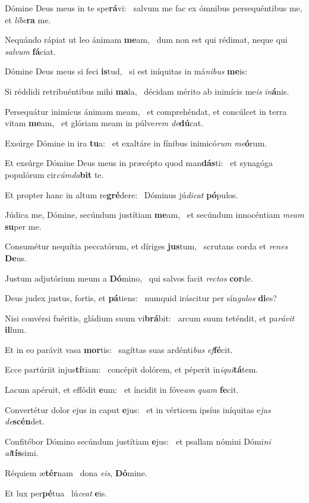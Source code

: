 \item Dómine Deus meus in te spe\textbf{rá}vi:~\psstar{} salvum me fac ex ómnibus persequéntibus me, et \textit{líbe}\textbf{ra} me.
\item Nequándo rápiat ut leo ánimam \textbf{me}am,~\psstar{} dum non est qui rédimat, neque qui \textit{salvum} \textbf{fá}ciat.
\item Dómine Deus meus si feci \textbf{is}tud,~\psstar{} si est iníquitas in má\textit{nibus} \textbf{me}is:
\item Si réddidi retribuéntibus mihi \textbf{ma}la,~\psstar{} décidam mérito ab inimícis me\textit{is} \textit{in}\textbf{á}nis.
\item Persequátur inimícus ánimam meam,~\pscross{} et comprehéndat, et concúlcet in terra vitam \textbf{me}am,~\psstar{} et glóriam meam in púlve\textit{rem} \textit{de}\textbf{dú}cat.
\item Exsúrge Dómine in ira \textbf{tu}a:~\psstar{} et exaltáre in fínibus inimicó\textit{rum} \textit{me}\textbf{ó}rum.
\item Et exsúrge Dómine Deus meus in præcépto quod man\textbf{dás}ti:~\psstar{} et synagóga populórum cir\textit{cúmda}\textbf{bit} te.
\item Et propter hanc in altum re\textbf{gré}dere:~\psstar{} Dóminus jú\textit{dicat} \textbf{pó}pulos.
\item Júdica me, Dómine, secúndum justítiam \textbf{me}am,~\psstar{} et secúndum innocéntiam \textit{meam} \textbf{su}per me.
\item Consumétur nequítia peccatórum, et díriges \textbf{jus}tum,~\psstar{} scrutans corda et \textit{renes} \textbf{De}us.
\item Justum adjutórium meum a \textbf{Dó}mino,~\psstar{} qui salvos facit \textit{rectos} \textbf{cor}de.
\item Deus judex justus, fortis, et \textbf{pá}tiens:~\psstar{} numquid iráscitur per sín\textit{gulos} \textbf{di}es?
\item Nisi convérsi fuéritis, gládium suum vi\textbf{brá}bit:~\psstar{} arcum suum teténdit, et pa\textit{rávit} \textbf{il}lum.
\item Et in eo parávit vasa \textbf{mor}tis:~\psstar{} sagíttas suas ardénti\textit{bus} \textit{ef}\hspace{-0.5mm}\textbf{fé}cit.
\item Ecce partúriit injus\textbf{tí}tiam:~\psstar{} concépit dolórem, et péperit in\textit{iqui}\textbf{tá}tem.
\item Lacum apéruit, et effódit \textbf{e}um:~\psstar{} et íncidit in fóve\textit{am} \textit{quam} \textbf{fe}cit.
\item Convertétur dolor ejus in caput \textbf{e}jus:~\psstar{} et in vérticem ipsíus iníquitas e\textit{jus} \textit{de}\textbf{scén}det.
\item Confitébor Dómino secúndum justítiam \textbf{e}jus:~\psstar{} et psallam nómini Dómi\textit{ni} \textit{al}\textbf{tís}simi.
\item Réquiem æ\textbf{tér}nam~\psstar{} dona \textit{eis}, \textbf{Dó}mine.
\item Et lux per\textbf{pé}tua~\psstar{} lú\textit{ceat} \textbf{e}is.